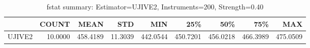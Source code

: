 \begin{table}[ht]
\centering
\caption{fstat summary: Estimator=UJIVE2, Instruments=200, Strength=0.40}
\begin{tabular}{lrrrrrrrr}
\toprule
 & COUNT & MEAN & STD & MIN & 25\% & 50\% & 75\% & MAX \\
\midrule
UJIVE2 & 10.0000 & 458.4189 & 11.3039 & 442.0544 & 450.7201 & 456.0218 & 466.3989 & 475.0509 \\
\bottomrule
\end{tabular}
\end{table}
